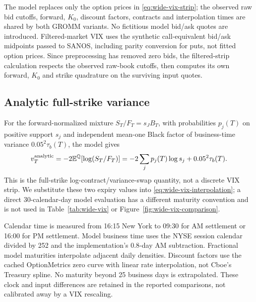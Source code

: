 The model replaces only the option prices in
\eqref{eq:wide-vix-strip}; the observed raw bid cutoffs, forward, $K_0$,
discount factors, contracts and interpolation times are shared by both
GROMM variants. No fictitious model bid/ask quotes are introduced.
Filtered-market VIX uses the synthetic call-equivalent bid/ask midpoints
passed to SANOS, including parity conversion for puts, not fitted option
prices. Since preprocessing has removed zero bids, the filtered-strip
calculation respects the observed raw-book cutoffs, then computes its own
forward, $K_0$ and strike quadrature on the surviving input quotes.

\subsection{Analytic full-strike variance}
For the forward-normalized mixture $S_T/F_T=s_JB_T$, with probabilities
$p_j(T)$ on positive support $s_j$ and independent mean-one Black factor
of business-time variance $0.05^2\tau_b(T)$, the model gives
\begin{equation}\label{eq:wide-analytic-variance}
  v_T^{\mathrm{analytic}}
  =-2\mathbb E^\mathbb Q\!\left[\log(S_T/F_T)\right]
  =-2\sum_jp_j(T)\log s_j+0.05^2\tau_b(T).
\end{equation}
This is the full-strike log-contract/variance-swap quantity, not a discrete
VIX strip. We substitute these two expiry values into
\eqref{eq:wide-vix-interpolation}; a direct 30-calendar-day model evaluation
has a different maturity convention and is not used in
Table~\ref{tab:wide-vix} or Figure~\ref{fig:wide-vix-comparison}.

Calendar time is measured from 16:15 New York to 09:30 for AM settlement
or 16:00 for PM settlement. Model business time uses the NYSE session
calendar divided by 252 and the implementation's $0.8$-day AM subtraction.
Fractional model maturities interpolate adjacent daily densities. Discount
factors use the cached OptionMetrics zero curve with linear rate
interpolation, not Cboe's Treasury spline. No maturity beyond 25 business
days is extrapolated. These clock and input differences are retained in
the reported comparisons, not calibrated away by a VIX rescaling.

